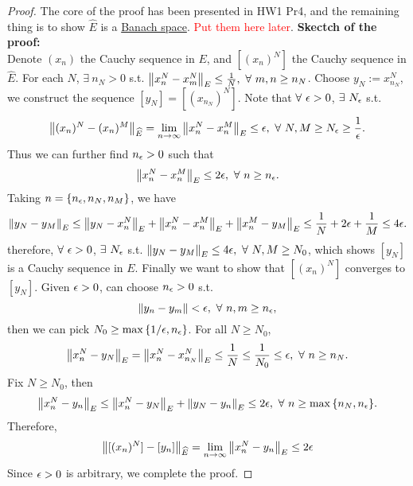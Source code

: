 \begin{proof}
The core of the proof has been presented in HW1 Pr4, and the remaining thing is to show $\hat{E}$ is a \underline{Banach space}. \textcolor{red}{Put them here later}. \textbf{Skectch of the proof:}\\
Denote $(x_n)$ the Cauchy sequence in $E$, and $[(x_n)^N]$ the Cauchy sequence in $\hat{E}$. For each $N$, $\exists\ n_N > 0$ s.t. $\norm{x_n^N - x_m^N}_E \leq \frac{1}{N},\ \forall\ m,n \geq n_N$. Choose $y_N := x_{n_N}^N$, we construct the sequence $[y_N] = [(x_{n_N})^N]$. Note that $\forall\ \epsilon > 0$, $\exists\ N_\epsilon$ s.t.
\begin{equation*}
    \norm{(x_n)^N - (x_n)^M}_{\widehat{E}} = \lim_{n \to \infty} \norm{x_n^N - x_n^M}_E  \leq \epsilon,\ \forall\ N,M \geq N_\epsilon \geq \frac{1}{\epsilon}.
\end{equation*}
Thus we can further find $n_\epsilon > 0$ such that
\begin{equation*}
    \norm{x_n^N - x_n^M}_E \leq 2 \epsilon,\ \forall\ n \geq n_\epsilon.
\end{equation*}
Taking $n = \{n_\epsilon,n_N,n_M\}$, we have
\begin{equation*}
    \norm{y_N - y_M}_E \leq \norm{y_N - x_n^N}_E + \norm{x_n^N - x_n^M}_E + \norm{x_n^M - y_M}_E \leq\frac{1}{N} + 2\epsilon  + \frac{1}{M} \leq  4\epsilon.
\end{equation*}
therefore, $\forall\ \epsilon > 0$, $\exists\ N_\epsilon$ s.t. $\norm{y_N - y_M}_E \leq 4\epsilon,\ \forall\ N,M \geq N_0$, which shows $[y_N]$ is a Cauchy sequence in $E$. Finally we want to show that $[(x_n)^N]$ converges to $[y_N]$. Given $\epsilon > 0$, can choose $n_\epsilon > 0$ s.t.
\begin{equation*}
    \norm{y_n - y_m} < \epsilon,\ \forall\ n,m \geq n_\epsilon,
\end{equation*}
then we can pick $N_0 \geq \max{\{1/\epsilon, n_\epsilon\}}$. For all $N \geq N_0$,
\begin{equation*}
    \norm{x_n^N - y_N}_E = \norm{x_n^N - x_{n_N}^N}_E \leq \frac{1}{N} \leq \frac{1}{N_0} \leq \epsilon,\ \forall\ n \geq n_N. 
\end{equation*}
Fix $N \geq N_0$, then
\begin{equation*}
    \norm{x_n^N - y_n}_E \leq \norm{x_n^N - y_N}_E + \norm{y_N - y_n}_E \leq 2\epsilon,\ \forall\ n \geq \max{\{n_N,n_\epsilon\}}.
\end{equation*}
Therefore,
\begin{equation*}
    \norm{[(x_n)^N] - [y_n]}_{\widehat{E}} = \lim_{n \to \infty} \norm{x_n^N - y_n}_E \leq 2\epsilon
\end{equation*}
Since $\epsilon > 0$ is arbitrary, we complete the proof.
\end{proof}


